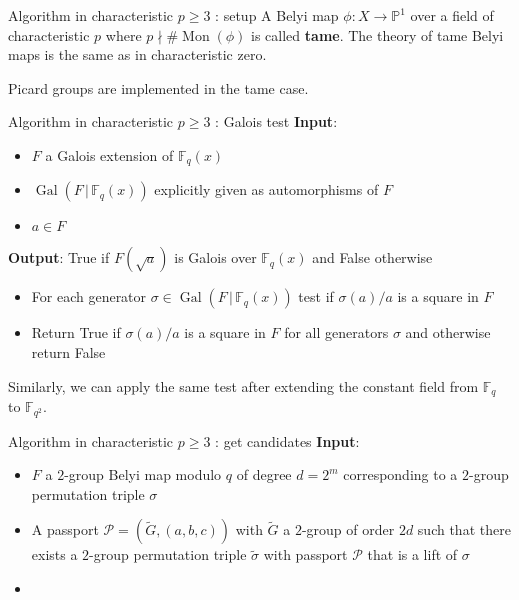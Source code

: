 \documentclass[xcolor=dvipsnames,handout]{beamer}
\theoremstyle{plain}
\newcommand{\PP}{\mathbb P}
\newcommand{\wt}[1]{\widetilde{#1}}
\newcommand{\FF}{\mathbb{F}}
\DeclareMathOperator{\Mon}{Mon}
\DeclareMathOperator{\Gal}{Gal}
\begin{document}
{\begin{frame}{Algorithm in characteristic $p\geq 3$ : setup}
      A Belyi map $\phi\colon X\to\PP^1$ over a field of
      characteristic $p$ where $p\nmid\#\Mon(\phi)$
      is called \textbf{tame}.
      The theory of tame Belyi maps is the same as in
      characteristic zero.
      \pause\par
      Picard groups are implemented in the tame case.
    \end{frame}
    \begin{frame}{Algorithm in characteristic $p\geq 3$ : Galois test}
      \textbf{Input}:
      \begin{itemize}
        \item
          $F$ a Galois extension of $\FF_q(x)$
        \item
          $\Gal(F\,|\,\FF_q(x))$ explicitly given as automorphisms of $F$
        \item
          $a\in F$
      \end{itemize}
      \textbf{Output}:
      True if $F(\sqrt{a})$ is Galois over $\FF_q(x)$
      and False otherwise
      \pause\par
      \begin{itemize}
        \item
          For each generator $\sigma\in\Gal(F\,|\,\FF_q(x))$
          test if $\sigma(a)/a$ is a square in $F$
        \item
          Return True if $\sigma(a)/a$ is a square in $F$
          for all generators $\sigma$
          and otherwise return False
      \end{itemize}
      \pause\par
      Similarly, we can apply the same test after
      extending the constant field from $\FF_q$
      to $\FF_{q^2}$.
    \end{frame}
    \begin{frame}{Algorithm in characteristic $p\geq 3$ : get candidates}
      \textbf{Input}:
      \begin{itemize}
        \item 
          $F$
          a $2$-group Belyi map modulo $q$
          of degree $d=2^m$
          corresponding to a $2$-group
          permutation triple $\sigma$
        \item
          A passport
          $\mathcal{P}=(\wt{G},(a,b,c))$
          with $\wt{G}$ a $2$-group of order
          $2d$ such that there
          exists a
          $2$-group permutation triple
          $\wt{\sigma}$ with passport
          $\mathcal{P}$
          that is a lift of
          $\sigma$
        \item

\end{itemize}
\end{frame}}
\end{document}
